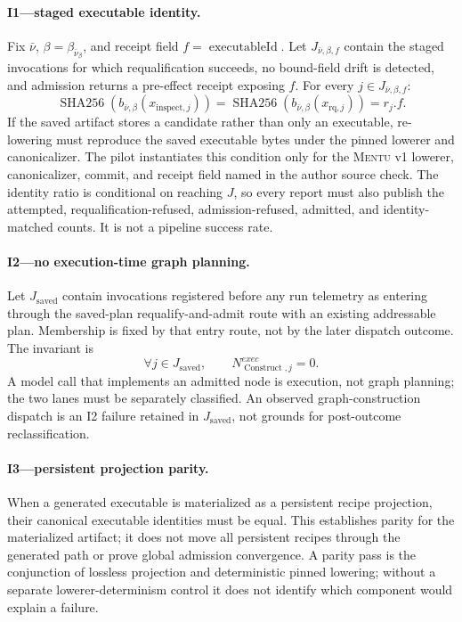 \documentclass[11pt]{article}
\newcommand{\mentu}{\textsc{Mentu}}
\begin{document}
\paragraph{I1---staged executable identity.}
Fix \(\bar\nu\), \(\beta=\beta_{\bar\nu_\beta}\), and receipt field
\(f=\operatorname{executableId}\). Let
\(J_{\bar\nu,\beta,f}\) contain the
staged invocations for which requalification succeeds, no bound-field drift is
detected, and admission returns a pre-effect receipt exposing \(f\). For every
\(j\in J_{\bar\nu,\beta,f}\):
\[
\operatorname{SHA256}(b_{\bar\nu,\beta}(x_{\mathrm{inspect},j}))
=\operatorname{SHA256}(b_{\bar\nu,\beta}(x_{\mathrm{rq},j}))
=r_j.f.
\]
If the saved artifact stores a candidate rather than only an executable,
re-lowering must reproduce the saved executable bytes under the pinned lowerer
and canonicalizer.  The pilot instantiates this condition only for the
\mentu{} v1 lowerer, canonicalizer, commit, and receipt field named in the
author source check. The identity ratio is conditional on reaching \(J\), so every
report must also publish the attempted, requalification-refused,
admission-refused, admitted, and identity-matched counts. It is not a pipeline
success rate.

\paragraph{I2---no execution-time graph planning.}
Let \(J_{\mathrm{saved}}\) contain invocations registered before any run
telemetry as entering through the saved-plan requalify-and-admit route with an
existing addressable plan. Membership is fixed by that entry route, not by the
later dispatch outcome. The invariant is
\[
\forall j\in J_{\mathrm{saved}},\qquad
N_{\operatorname{Construct},j}^{exec}=0.
\]
A model call that implements an admitted node is execution, not graph
planning; the two lanes must be separately classified. An observed
graph-construction dispatch is an I2 failure retained in
\(J_{\mathrm{saved}}\), not grounds for post-outcome reclassification.

\paragraph{I3---persistent projection parity.}
When a generated executable is materialized as a persistent recipe projection,
their canonical executable identities must be equal.  This establishes parity
for the materialized artifact; it does not move all persistent recipes through
the generated path or prove global admission convergence. A parity pass is the
conjunction of lossless projection and deterministic pinned lowering; without
a separate lowerer-determinism control it does not identify which component
would explain a failure.
\end{document}
